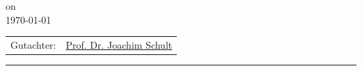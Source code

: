 \documentclass[12pt,final,twoside]{report}
\makeatletter
\newcommand{\trauthor}{Vincent Dahmen}
\newcommand{\trmatrikelnummer}{6689845}
\newcommand{\trdate}{\today}
\newcommand{\trgutachterA}{\href{mailto:jshult47@gmail.com}{Prof. Dr. Joachim Schult}}
\theoremstyle{plain}
\theoremstyle{definition}
\theoremstyle{remark}
\makeatother
\begin{document}
\begin{titlepage}
\begin{center}
      on\\
      \trdate
    \end{center}
    \vspace{2cm}
    \begin{center}
    \begin{tabular}{ll}
    Gutachter: & \trgutachterA \\
    \end{tabular}
    \end{center}
    \vfill
    \rule{\textwidth}{0.4pt}
    \newpage 
\end{titlepage}

\thispagestyle{empty}
\hspace{1cm}
\newpage

%
%

\tableofcontents
\cleardoublepage

\fancyhead[LE]{\it \leftmark}           %
\fancyhead[RO]{\it \rightmark}          %
\fancyhead[LO,RE]{}                     %
\end{document}
